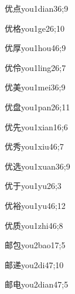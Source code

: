 \begin{verbete}{优点}{you1dian3}{6;9}
\end{verbete}
\begin{verbete}{优格}{you1ge2}{6;10}
\end{verbete}
\begin{verbete}{优厚}{you1hou4}{6;9}
\end{verbete}
\begin{verbete}{优伶}{you1ling2}{6;7}
\end{verbete}
\begin{verbete}{优美}{you1mei3}{6;9}
\end{verbete}
\begin{verbete}{优盘}{you1pan2}{6;11}
\end{verbete}
\begin{verbete}{优先}{you1xian1}{6;6}
\end{verbete}
\begin{verbete}{优秀}{you1xiu4}{6;7}
\end{verbete}
\begin{verbete}{优选}{you1xuan3}{6;9}
\end{verbete}
\begin{verbete}{优于}{you1yu2}{6;3}
\end{verbete}
\begin{verbete}{优裕}{you1yu4}{6;12}
\end{verbete}
\begin{verbete}{优质}{you1zhi4}{6;8}
\end{verbete}
\begin{verbete}{邮包}{you2bao1}{7;5}
\end{verbete}
\begin{verbete}{邮递}{you2di4}{7;10}
\end{verbete}
\begin{verbete}{邮电}{you2dian4}{7;5}
\end{verbete}
